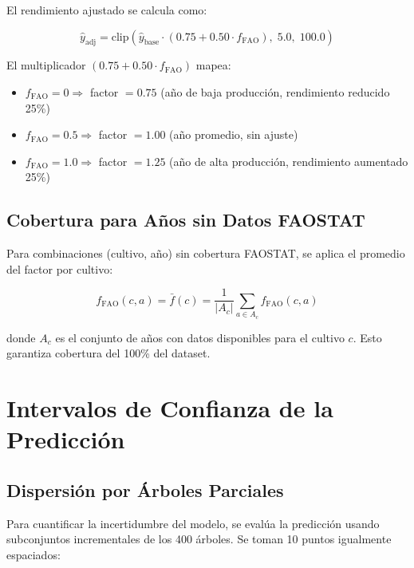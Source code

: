 \documentclass[12pt, a4paper]{article}
\begin{document}
El rendimiento ajustado se calcula como:

\begin{equation}
  \hat{y}_{\text{adj}} = \text{clip}\!\left(\hat{y}_{\text{base}} \cdot \left(0.75 + 0.50 \cdot f_{\text{FAO}}\right),\; 5.0,\; 100.0\right)
  \label{eq:faostat_cal}
\end{equation}

El multiplicador $(0.75 + 0.50 \cdot f_{\text{FAO}})$ mapea:
\begin{itemize}
  \item $f_{\text{FAO}} = 0 \Rightarrow$ factor $= 0.75$ (año de baja producción, rendimiento reducido 25\%)
  \item $f_{\text{FAO}} = 0.5 \Rightarrow$ factor $= 1.00$ (año promedio, sin ajuste)
  \item $f_{\text{FAO}} = 1.0 \Rightarrow$ factor $= 1.25$ (año de alta producción, rendimiento aumentado 25\%)
\end{itemize}

\subsection{Cobertura para Años sin Datos FAOSTAT}

Para combinaciones (cultivo, año) sin cobertura FAOSTAT, se aplica el promedio del factor por cultivo:

\begin{equation}
  f_{\text{FAO}}(c, a) = \bar{f}(c) = \frac{1}{|A_c|} \sum_{a \in A_c} f_{\text{FAO}}(c, a)
  \label{eq:fao_fallback}
\end{equation}

donde $A_c$ es el conjunto de años con datos disponibles para el cultivo $c$. Esto garantiza cobertura del 100\% del dataset.

\section{Intervalos de Confianza de la Predicción}

\subsection{Dispersión por Árboles Parciales}

Para cuantificar la incertidumbre del modelo, se evalúa la predicción usando subconjuntos incrementales de los 400 árboles. Se toman 10 puntos igualmente espaciados:
\end{document}
